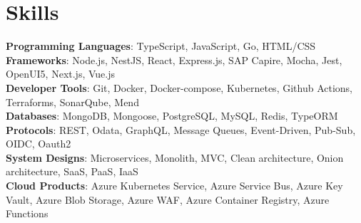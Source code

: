 \documentclass[letterpaper,11pt]{article}
\begin{document}
\section{Skills}
 \begin{itemize}[leftmargin=0.15in, label={}]
    \small{\item{
     \textbf{Programming Languages}{: TypeScript, JavaScript, Go, HTML/CSS} \\
     \textbf{Frameworks}{: Node.js, NestJS, React, Express.js, SAP Capire, Mocha, Jest, OpenUI5, Next.js, Vue.js } \\
     \textbf{Developer Tools}{: Git, Docker, Docker-compose, Kubernetes, Github Actions, Terraforms, SonarQube, Mend} \\
     \textbf{Databases}{: MongoDB, Mongoose, PostgreSQL, MySQL, Redis, TypeORM} \\
     \textbf{Protocols}{: REST, Odata, GraphQL, Message Queues, Event-Driven, Pub-Sub, OIDC, Oauth2} \\
     \textbf{System Designs}{: Microservices, Monolith, MVC, Clean architecture, Onion architecture, SaaS, PaaS, IaaS} \\
     \textbf{Cloud Products}{: Azure Kubernetes Service, Azure Service Bus, Azure Key Vault, Azure Blob Storage, Azure WAF, Azure Container Registry, Azure Functions }
    }}
 \end{itemize}


\end{document}
